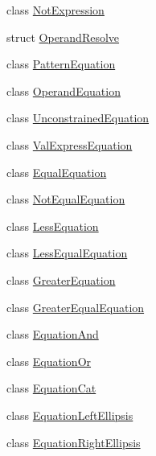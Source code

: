 \begin{DoxyCompactItemize}
\item 
class \mbox{\hyperlink{class_not_expression}{Not\+Expression}}
\item 
struct \mbox{\hyperlink{struct_operand_resolve}{Operand\+Resolve}}
\item 
class \mbox{\hyperlink{class_pattern_equation}{Pattern\+Equation}}
\item 
class \mbox{\hyperlink{class_operand_equation}{Operand\+Equation}}
\item 
class \mbox{\hyperlink{class_unconstrained_equation}{Unconstrained\+Equation}}
\item 
class \mbox{\hyperlink{class_val_express_equation}{Val\+Express\+Equation}}
\item 
class \mbox{\hyperlink{class_equal_equation}{Equal\+Equation}}
\item 
class \mbox{\hyperlink{class_not_equal_equation}{Not\+Equal\+Equation}}
\item 
class \mbox{\hyperlink{class_less_equation}{Less\+Equation}}
\item 
class \mbox{\hyperlink{class_less_equal_equation}{Less\+Equal\+Equation}}
\item 
class \mbox{\hyperlink{class_greater_equation}{Greater\+Equation}}
\item 
class \mbox{\hyperlink{class_greater_equal_equation}{Greater\+Equal\+Equation}}
\item 
class \mbox{\hyperlink{class_equation_and}{Equation\+And}}
\item 
class \mbox{\hyperlink{class_equation_or}{Equation\+Or}}
\item 
class \mbox{\hyperlink{class_equation_cat}{Equation\+Cat}}
\item 
class \mbox{\hyperlink{class_equation_left_ellipsis}{Equation\+Left\+Ellipsis}}
\item 
class \mbox{\hyperlink{class_equation_right_ellipsis}{Equation\+Right\+Ellipsis}}
\end{DoxyCompactItemize}
